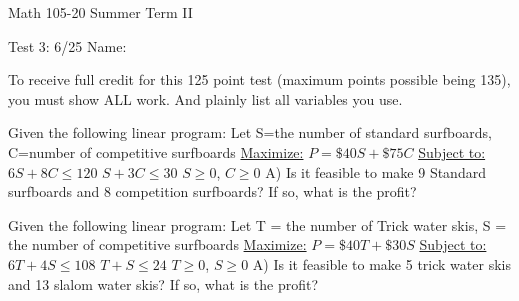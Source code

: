 \documentclass[11pt,epsfig]{article}
\begin{document}
Math 105-20 Summer Term II 

Test 3: 6/25 \hspace{1.9in} {Name:} {\underline {\hspace{3.5in}}}
\vspace{1pc}

To receive full credit for this 125 point test (maximum points possible being 135), you must show ALL work. And plainly list all variables you use.
\vspace{0.5pc}






\begin{problem}{10}
Given the following linear program:
\newline
\newline
Let S=the number of standard surfboards, C=number of competitive surfboards
\newline
\underline{Maximize:}\hspace*{0.5cm} $P=\$40S+\$75C$
\newline
\underline{Subject to:}\hspace*{0.45cm}
$6S+8C\leq 120$ 
\newline
\hspace*{2.4cm}$S+3C\leq 30$
\newline
\hspace*{2.4cm}$S \geq 0$, $C\geq 0$
\newline
\newline
A) Is it feasible to make 9 Standard surfboards and 8 competition surfboards? If so, what is the profit?
\vfill
\end{problem}





\begin{problem}{10}
Given the following linear program:
\newline
\newline
Let T = the number of Trick water skis, S = the number of competitive surfboards
\newline
\underline{Maximize:}\hspace*{0.5cm}  $P=\$40T+\$30S$
\newline
\underline{Subject to:}\hspace*{0.45cm} $6T+4S\leq 108$ 
\newline
\hspace*{2.4cm}$T+S\leq 24$
\newline
\hspace*{2.4cm}$T \geq 0$, $S\geq 0$
\newline
\newline
A) Is it feasible to make 5 trick water skis and 13 slalom water skis? If so, what is the profit?
\vfill
\end{problem}
\end{document}

